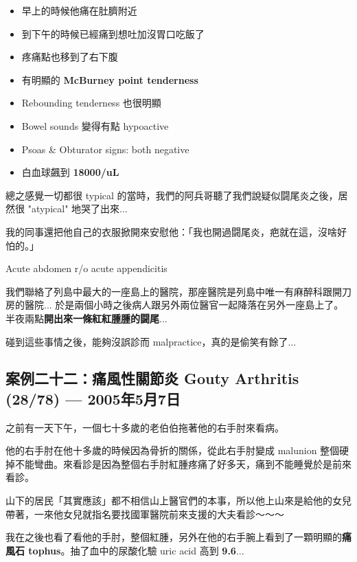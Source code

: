 \documentclass[12pt,a4paper]{article}
\newenvironment{myquote}{%
    \begin{tcolorbox}[
        colback=quote_bg,
        colframe=emergency_gray,
        boxrule=0pt,
        leftrule=3pt,
        arc=0pt,
        left=10pt,
        right=10pt,
        top=8pt,
        bottom=8pt
    ]
    \itshape
}{%
    \end{tcolorbox}
}
\begin{document}
\begin{itemize}
    \item 早上的時候他痛在肚臍附近
    \item 到下午的時候已經痛到想吐加沒胃口吃飯了
    \item 疼痛點也移到了右下腹
    \item 有明顯的 \textbf{McBurney point tenderness}
    \item Rebounding tenderness 也很明顯
    \item Bowel sounds 變得有點 hypoactive
    \item Psoas \& Obturator signs: both negative
    \item 白血球飆到 \textbf{18000/uL}
\end{itemize}

總之感覺一切都很 typical 的當時，我們的阿兵哥聽了我們說疑似闘尾炎之後，居然很 "atypical" 地哭了出來...

我的同事還把他自己的衣服掀開來安慰他：「我也開過闘尾炎，疤就在這，沒啥好怕的。」

\begin{tcolorbox}[
    colback=emergency_blue!10!white,
    colframe=emergency_blue,
    title=\textbf{Diagnosis},
    fonttitle=\bfseries
]
Acute abdomen r/o acute appendicitis
\end{tcolorbox}

我們聯絡了列島中最大的一座島上的醫院，那座醫院是列島中唯一有麻醉科跟開刀房的醫院... 於是兩個小時之後病人跟另外兩位醫官一起降落在另外一座島上了。半夜兩點\textbf{開出來一條紅紅腫腫的闘尾}...

\begin{myquote}
碰到這些事情之後，能夠沒誤診而 malpractice，真的是偷笑有餘了...
\end{myquote}

\subsection{案例二十二：痛風性關節炎 Gouty Arthritis (28/78) — 2005年5月7日}

之前有一天下午，一個七十多歲的老伯伯拖著他的右手肘來看病。

他的右手肘在他十多歲的時候因為骨折的關係，從此右手肘變成 malunion 整個硬掉不能彎曲。來看診是因為整個右手肘紅腫疼痛了好多天，痛到不能睡覺於是前來看診。

山下的居民「其實應該」都不相信山上醫官們的本事，所以他上山來是給他的女兒帶著，一來他女兒就指名要找國軍醫院前來支援的大夫看診～～～

我在之後也看了看他的手肘，整個紅腫，另外在他的右手腕上看到了一顆明顯的\textbf{痛風石 tophus}。抽了血中的尿酸化驗 uric acid 高到 \textbf{9.6}...
\end{document}
